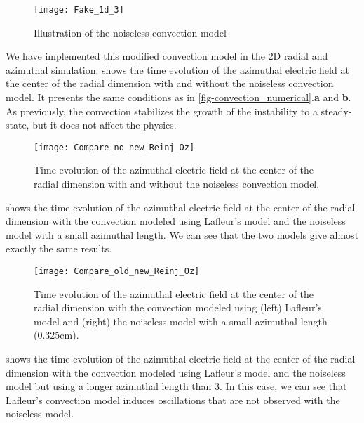      \begin{figure}[hbt]
        \centering
        \texttt{[image: Fake\_1d\_3]}
        \caption{Illustration of the noiseless convection model}
        \label{fig-fakez3}
      \end{figure}
      
      We have implemented this modified convection model in the \ac{2D} radial and azimuthal simulation.
       shows the time  evolution of the azimuthal electric field at the center of the radial dimension with and without the noiseless convection model.
      It presents the same conditions as in \cref{fig-convection_numerical}.{\bf a} and {\bf b}. 
      As previously, the convection stabilizes the growth of the instability to a steady-state, but it does not affect the physics.
       
      
      \begin{figure}[hbt]
        \centering
        \texttt{[image: Compare\_no\_new\_Reinj\_Oz]}
        \caption{Time evolution of the azimuthal electric field at the center of the radial dimension with and without the noiseless convection model. }
        \label{fig-newconv_noconv}
      \end{figure}
      
      
       shows the time  evolution of the azimuthal electric field at the center of the radial dimension  with the convection modeled using Lafleur's model and the noiseless model with a small azimuthal length.
      We can see that the two models give almost exactly the same results.
      
      \begin{figure}[hbt]
        \centering
        \texttt{[image: Compare\_old\_new\_Reinj\_Oz]}
        \caption{Time evolution of the azimuthal electric field at the center of the radial dimension with the convection modeled using (left) Lafleur's model and (right) the noiseless model with a small azimuthal length (0.325cm).}
        \label{fig-oldeconv_newconv}
      \end{figure}
      
      
       shows the  time  evolution of the azimuthal electric field at the center of the radial dimension  with the convection modeled using Lafleur's model and the noiseless model but using a longer azimuthal length than \cref{fig-oldeconv_newconv}.
      In this case, we can see that Lafleur's convection model induces oscillations that are not observed with the noiseless model.
      
